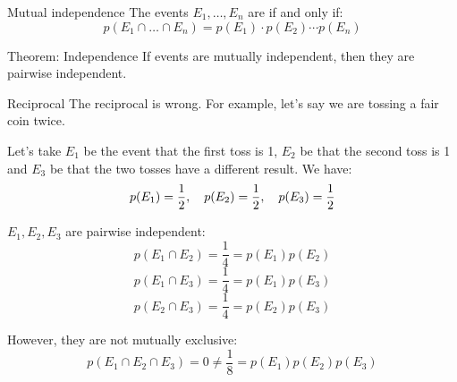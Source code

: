 \documentclass[a4paper]{article}
\begin{document}
\begin{parag}{Mutual independence}
    The events $E_1, \ldots, E_n$ are  if and only if: 
    \[p\left(E_1 \cap \ldots \cap E_n\right) = p\left(E_1\right)\cdot p\left(E_2\right) \cdots p\left(E_n\right)\]
\end{parag}

\begin{parag}{Theorem: Independence}
    If events are mutually independent, then they are pairwise independent.

    \begin{subparag}{Reciprocal}
        The reciprocal is wrong. For example, let's say we are tossing a fair coin twice.

        Let's take $E_1$ be the event that the first toss is 1, $E_2$ be that the second toss is 1 and $E_3$ be that the two tosses have a different result. We have: 
        \[p\left(E_1\right) = \frac{1}{2}, \mathspace p\left(E_2\right) = \frac{1}{2}, \mathspace p\left(E_3\right) = \frac{1}{2}\]

        $E_1, E_2, E_3$ are pairwise independent: 
        \[p\left(E_1 \cap E_2\right) = \frac{1}{4} = p\left(E_1\right)p\left(E_2\right)\]
        \[p\left(E_1 \cap E_3\right) = \frac{1}{4} = p\left(E_1\right)p\left(E_3\right)\]
        \[p\left(E_2 \cap E_3\right) = \frac{1}{4} = p\left(E_2\right)p\left(E_3\right)\]
        
        However, they are not mutually exclusive: 
        \[p\left(E_1 \cap E_2 \cap E_3\right) = 0 \neq \frac{1}{8} = p\left(E_1\right)p\left(E_2\right)p\left(E_3\right)\]
    \end{subparag}
\end{parag}
\end{document}
